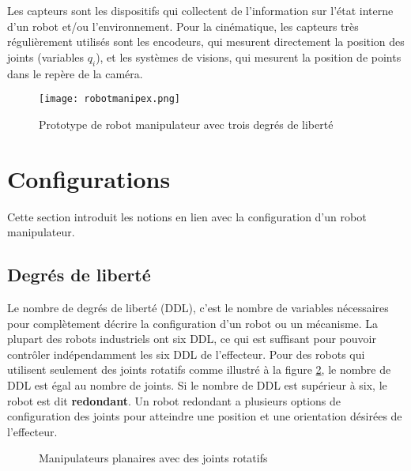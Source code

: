 Les capteurs sont les dispositifs qui collectent de l'information sur l'état interne d'un robot et/ou l’environnement. Pour la cinématique, les capteurs très régulièrement utilisés sont les encodeurs, qui mesurent directement la position des joints (variables $q_i$), et les systèmes de visions, qui mesurent la position de points dans le repère de la caméra.


\begin{figure}[htbp]
	\centering
	\texttt{[image: robotmanipex.png]}
	\caption{Prototype de robot manipulateur avec trois degrés de liberté}
	\label{fig:robotmanipex}
\end{figure}


\section{Configurations}

Cette section introduit les notions en lien avec la configuration d'un robot manipulateur.

\subsection{Degrés de liberté}

Le nombre de degrés de liberté (DDL), c'est le nombre de variables nécessaires pour complètement décrire la configuration d'un robot ou un mécanisme. La plupart des robots industriels ont six DDL, ce qui est suffisant pour pouvoir contrôler indépendamment les six DDL de l'effecteur. Pour des robots qui utilisent seulement des joints rotatifs comme illustré à la figure \ref{fig:ddl}, le nombre de DDL est égal au nombre de joints. Si le nombre de DDL est supérieur à six, le robot est dit \textbf{redondant}. Un robot redondant a plusieurs options de configuration des joints pour atteindre une position et une orientation désirées de l'effecteur.

\begin{figure}[H]
	\centering
	\caption{Manipulateurs planaires avec des joints rotatifs}
	\label{fig:ddl}
\end{figure}

